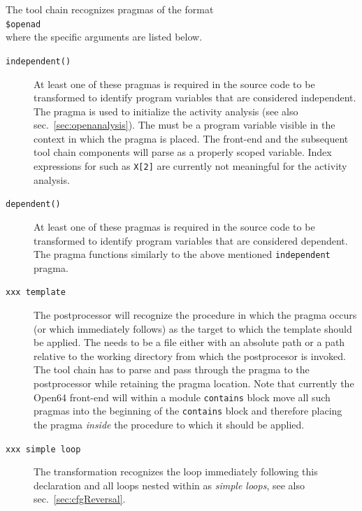 \documentclass{book}
\newcommand{\refsec}[1]{{sec.~\ref{#1}}}
\begin{document}
The tool chain recognizes pragmas of the format\\[1ex]
\hspace*{.3cm}\lstinline{$openad }{\tt\em <pragma argument>}\\[1ex] %
where the specific arguments are listed below.  
\begin{description} 
\item[\tt independent({\em <variable name>})] At least one of these pragmas is required in the source 
code to be transformed to identify program variables that are considered independent. 
The pragma is used to initialize the activity analysis (see also \refsec{sec:openanalysis}).
The {\em <variable name>} must be a program variable visible in the context in which the pragma is placed.
The front-end and the subsequent tool chain components will parse {\em <variable name>} as a properly 
scoped variable. Index expressions for {\em <variable name>} such as \lstinline{X[2]} are currently not meaningful
for the activity analysis.
\item[\tt dependent({\em <variable name>})] At least one of these pragmas is required in the source 
code to be transformed to identify program variables that are considered dependent.
The pragma functions similarly to the above mentioned \lstinline{independent} pragma. 
\item[\tt xxx template {\em <template file>}] The postprocessor will recognize 
the procedure in which the pragma occurs (or which immediately follows) as the target to which 
the template should be applied. 
The {\em <template file>} needs to be a file either with an absolute path or a 
path relative to the working directory from which the postprocesor is invoked. 
The tool chain has to  parse and pass through the pragma to the postprocessor while retaining the pragma location.
Note that currently the Open64 front-end will within a module \lstinline{contains} block move all such pragmas into the 
beginning of the \lstinline{contains} block and therefore placing the pragma {\em inside} the procedure 
to which it should be applied.
\item[\tt xxx simple loop] The transformation recognizes the loop immediately following this declaration and all 
loops nested within as {\em simple loops}, see also \refsec{sec:cfgReversal}.
\end{description}

\end{document}
